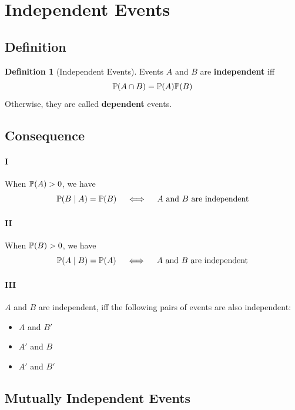 \documentclass[10pt,UTF8]{article}
\newenvironment{definition box}
{\begin{tcolorbox}[colback=blue!5!white,colframe=blue!75!black,parbox=false,before upper=\par,before lower=\par]}
{\end{tcolorbox}}
\newenvironment{theorem box}
{\begin{tcolorbox}[colback=yellow!5!white,colframe=yellow!75!black,parbox=false,before upper=\par,before lower=\par]}
{\end{tcolorbox}}
\theoremstyle{definition}
\newtheorem{definition inner}{Definition}[section]
\newenvironment{definition}[1][]
{\begin{definition box}\begin{definition inner}[#1]\hfill\par}
{\end{definition inner}\end{definition box}}
\theoremstyle{plain}
\newtheorem{theorem inner}{Theorem}[section]
\theoremstyle{definition}
\newtheorem*{proof inner}{\textit{Proof}}
\theoremstyle{remark}
\newcommand{\Prob}{\mathbb{P}\qty}
\begin{document}
\section{Independent Events}

\subsection{Definition}
\begin{definition}[Independent Events]
    Events $A$ and $B$ are \textbf{independent} iff
    \begin{equation*}
        \Prob(A\cap B) = \Prob(A)\Prob(B)
    \end{equation*}
    Otherwise, they are called \textbf{dependent} events.
\end{definition}
    
\subsection{Consequence}

\paragraph{I}
When $\Prob(A)>0$, we have
\begin{equation*}
    \Prob(B\mid A) = \Prob(B) \quad \iff \quad A \text{ and } B \text{ are independent}
\end{equation*}

\paragraph{II}
When $\Prob(B)>0$, we have
\begin{equation*}
    \Prob(A\mid B) = \Prob(A) \quad \iff \quad A \text{ and } B \text{ are independent}
\end{equation*}

\paragraph{III}
$A$ and $B$ are independent, iff the following pairs of events are also independent:
\begin{itemize}
    \item $A$ and $B'$
    \item $A'$ and $B$
    \item $A'$ and $B'$
\end{itemize}

\subsection{Mutually Independent Events}
\end{document}

